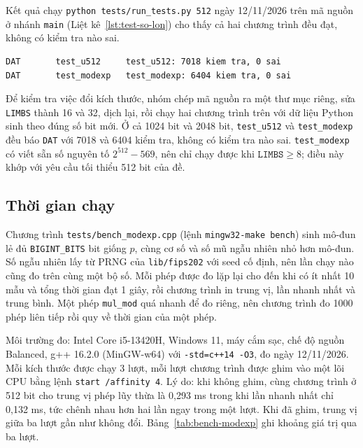 Kết quả chạy \texttt{python tests/run\_tests.py 512} ngày 12/11/2026 trên mã nguồn ở nhánh \texttt{main} (Liệt kê~\ref{lst:test-so-lon}) cho thấy cả hai chương trình đều đạt, không có kiểm tra nào sai.

\begin{lstlisting}[numbers=none, caption={Hai dòng của \texttt{test\_u512} và \texttt{test\_modexp} trong kết quả \texttt{python tests/run\_tests.py 512}, chạy ngày 12/11/2026}, label={lst:test-so-lon}]
DAT       test_u512     test_u512: 7018 kiem tra, 0 sai
DAT       test_modexp   test_modexp: 6404 kiem tra, 0 sai
\end{lstlisting}

Để kiểm tra việc đổi kích thước, nhóm chép mã nguồn ra một thư mục riêng, sửa \texttt{LIMBS} thành 16 và 32, dịch lại, rồi chạy hai chương trình trên với dữ liệu Python sinh theo đúng số bit mới. Ở cả 1024 bit và 2048 bit, \texttt{test\_u512} và \texttt{test\_modexp} đều báo \texttt{DAT} với 7018 và 6404 kiểm tra, không có kiểm tra nào sai. \texttt{test\_modexp} có viết sẵn số nguyên tố $2^{512} - 569$, nên chỉ chạy được khi $\texttt{LIMBS} \ge 8$; điều này khớp với yêu cầu tối thiểu 512 bit của đề.

\subsection{Thời gian chạy}
\label{subsec:thoi-gian-so-lon}

Chương trình \texttt{tests/bench\_modexp.cpp} (lệnh \texttt{mingw32-make bench}) sinh mô-đun lẻ đủ \texttt{BIGINT\_BITS} bit giống $p$, cùng cơ số và số mũ ngẫu nhiên nhỏ hơn mô-đun. Số ngẫu nhiên lấy từ PRNG của \texttt{lib/fips202} với seed cố định, nên lần chạy nào cũng đo trên cùng một bộ số. Mỗi phép được đo lặp lại cho đến khi có ít nhất 10 mẫu và tổng thời gian đạt 1 giây, rồi chương trình in trung vị, lần nhanh nhất và trung bình. Một phép \texttt{mul\_mod} quá nhanh để đo riêng, nên chương trình đo 1000 phép liên tiếp rồi quy về thời gian của một phép.

Môi trường đo: Intel Core i5-13420H, Windows 11, máy cắm sạc, chế độ nguồn Balanced, g++ 16.2.0 (MinGW-w64) với \texttt{-std=c++14 -O3}, đo ngày 12/11/2026. Mỗi kích thước được chạy 3 lượt, mỗi lượt chương trình được ghim vào một lõi CPU bằng lệnh \texttt{start /affinity 4}. Lý do: khi không ghim, cùng chương trình ở 512 bit cho trung vị phép lũy thừa là 0,293 ms trong khi lần nhanh nhất chỉ 0,132 ms, tức chênh nhau hơn hai lần ngay trong một lượt. Khi đã ghim, trung vị giữa ba lượt gần như không đổi. Bảng~\ref{tab:bench-modexp} ghi khoảng giá trị qua ba lượt.

